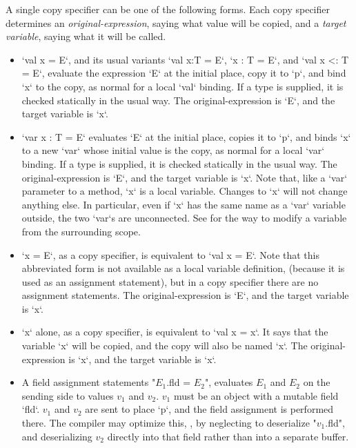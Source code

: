 A single copy specifier can be one of the following forms.   
Each copy specifier determines an {\em original-expression}, saying what value
will be copied, and a {\em target variable}, saying what it will be called.

\begin{itemize}

\item \xcd`val x = E`, and its usual variants \xcd`val x:T = E`, 
      \xcd`x : T = E`, and 
      \xcd`val x <: T = E`, evaluate the expression \xcd`E` at the initial
      place, copy it to \xcd`p`, and bind \xcd`x` to the copy, as normal for a
      local \xcd`val` binding.  If a type is supplied, it is checked
      statically in the usual way.  
      The original-expression is \xcd`E`, and the target variable is \xcd`x`.

\item \xcd`var x : T = E` evaluates \xcd`E` at the initial place, copies it to
      \xcd`p`, and binds \xcd`x` to a new \xcd`var` whose initial value is the
      copy, as normal for a local \xcd`var` binding.
      If a type is supplied, it is checked
      statically in the usual way.
      The original-expression is \xcd`E`, and the target variable is \xcd`x`.
      Note that, like a \xcd`var` parameter to a method, \xcd`x` is a local
      variable.  Changes to \xcd`x` will not change anything else. In
      particular, even if \xcd`x` has the same name as a \xcd`var` variable
      outside, the two \xcd`var`s are unconnected.  
      See  for the way to modify a variable from the
      surrounding scope.

\item \xcd`x = E`, as a copy specifier, is equivalent to \xcd`val x = E`.
      Note that this abbreviated form is not available as a local variable
      definition, (because it is used as an assignment statement), but in a
      copy specifier there are no assignment statements.
      The original-expression is \xcd`E`, and the target variable is \xcd`x`.

\item \xcd`x` alone, as a copy specifier, is equivalent to \xcd`val x = x`.
      It says that the variable \xcd`x` will be copied, and the copy will also
      be named \xcd`x`.  
      The original-expression is \xcd`x`, and the target variable is \xcd`x`.

\item A field assignment statements \xcdmath"$E_1$.fld = $E_2$", evaluates 
      $E_1$ and $E_2$ on the sending side to values $v_1$ and {$v_2$}.  
      {$v_1$} must be an object with a mutable field \xcd`fld`.  {$v_1$} and
      {$v_2$} are sent to place \xcd`p`, and the field assignment is performed
      there.   The compiler may optimize this, \eg, by neglecting to
      deserialize \xcdmath"$v_1$.fld", and deserializing {$v_2$} directly into
      that field rather than into a separate buffer.


\end{itemize}
